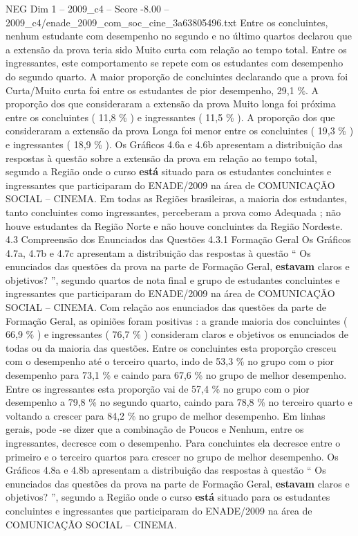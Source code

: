 \begin{textsample}{NEG Dim 1 – 2009\_c4 – Score -8.00 – 2009\_c4/enade\_2009\_com\_soc\_cine\_3a63805496.txt}
Entre os concluintes, nenhum estudante com desempenho no segundo e no último quartos declarou que a extensão da prova teria sido Muito curta com relação ao tempo total.
Entre os ingressantes, este comportamento se repete com os estudantes com desempenho do segundo quarto.
A maior proporção de concluintes declarando que a prova foi Curta/Muito curta foi entre os estudantes de pior desempenho, 29,1 \%.
A proporção dos que consideraram a extensão da prova Muito longa foi próxima entre os concluintes ( 11,8 \% ) e ingressantes ( 11,5 \% ).
A proporção dos que consideraram a extensão da prova Longa foi menor entre os concluintes ( 19,3 \% ) e ingressantes ( 18,9 \% ).
Os Gráficos 4.6a e 4.6b apresentam a distribuição das respostas à questão sobre a extensão da prova em relação ao tempo total, segundo a Região onde o curso \textbf{está} situado para os estudantes concluintes e ingressantes que participaram do ENADE/2009 na área de COMUNICAÇÃO SOCIAL – CINEMA.
Em todas as Regiões brasileiras, a maioria dos estudantes, tanto concluintes como ingressantes, perceberam a prova como Adequada ; não houve estudantes da Região Norte e não houve concluintes da Região Nordeste. 4.3 Compreensão dos Enunciados das Questões 4.3.1 Formação Geral Os Gráficos 4.7a, 4.7b e 4.7c apresentam a distribuição das respostas à questão “ Os enunciados das questões da prova na parte de Formação Geral, \textbf{estavam} claros e objetivos? ”, segundo quartos de nota final e grupo de estudantes concluintes e ingressantes que participaram do ENADE/2009 na área de COMUNICAÇÃO SOCIAL – CINEMA.
Com relação aos enunciados das questões da parte de Formação Geral, as opiniões foram positivas : a grande maioria dos concluintes ( 66,9 \% ) e ingressantes ( 76,7 \% ) consideram claros e objetivos os enunciados de todas ou da maioria das questões.
Entre os concluintes esta proporção cresceu com o desempenho até o terceiro quarto, indo de 53,3 \% no grupo com o pior desempenho para 73,1 \% e caindo para 67,6 \% no grupo de melhor desempenho.
Entre os ingressantes esta proporção vai de 57,4 \% no grupo com o pior desempenho a 79,8 \% no segundo quarto, caindo para 78,8 \% no terceiro quarto e voltando a crescer para 84,2 \% no grupo de melhor desempenho.
Em linhas gerais, pode -se dizer que a combinação de Poucos e Nenhum, entre os ingressantes, decresce com o desempenho.
Para concluintes ela decresce entre o primeiro e o terceiro quartos para crescer no grupo de melhor desempenho.
Os Gráficos 4.8a e 4.8b apresentam a distribuição das respostas à questão “ Os enunciados das questões da prova na parte de Formação Geral, \textbf{estavam} claros e objetivos? ”, segundo a Região onde o curso \textbf{está} situado para os estudantes concluintes e ingressantes que participaram do ENADE/2009 na área de COMUNICAÇÃO SOCIAL – CINEMA.

\end{textsample}
